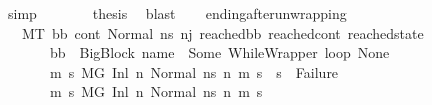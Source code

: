 \begin{isabellebody}
\ simp\isanewline
\ \ \ \ \isamarkupfalse%
\ \isamarkupfalse%
\ {\isacharquery}{\kern0pt}thesis\ \isamarkupfalse%
\ blast\isanewline
\ \ \isamarkupfalse%
\isanewline
{}\isamarkupfalse%
%
\endisatagproof
{\isafoldproof}%
%
\isadelimproof
\isanewline
%
\endisadelimproof
\isanewline
{}\isamarkupfalse%
\ ending{\isacharunderscore}{\kern0pt}after{\isacharunderscore}{\kern0pt}unwrapping{\isacharcolon}{\kern0pt}\isanewline
\ \ \ {\isachardoublequoteopen}M{\isacharcomma}{\kern0pt}{\isasymLambda}{\isacharcomma}{\kern0pt}{\isasymGamma}{\isacharcomma}{\kern0pt}{\isasymOmega}{\isacharcomma}{\kern0pt}T\ {\isasymturnstile}{\isacharparenleft}{\kern0pt}bb{\isacharcomma}{\kern0pt}\ cont{}{\isacharcomma}{\kern0pt}\ Normal\ ns{}{\isacharprime}{\kern0pt}{\isacharprime}{\kern0pt}{\isacharparenright}{\kern0pt}\ {\isacharminus}{\kern0pt}n{\isasymlongrightarrow}{\isacharcircum}{\kern0pt}j\ {\isacharparenleft}{\kern0pt}reached{\isacharunderscore}{\kern0pt}bb{\isacharcomma}{\kern0pt}\ reached{\isacharunderscore}{\kern0pt}cont{\isacharcomma}{\kern0pt}\ reached{\isacharunderscore}{\kern0pt}state{\isacharparenright}{\kern0pt}{\isachardoublequoteclose}\ \isanewline
\ \ \ \ \ \ \ {\isachardoublequoteopen}bb\ {\isacharequal}{\kern0pt}\ BigBlock\ name\ {\isacharbrackleft}{\kern0pt}{\isacharbrackright}{\kern0pt}\ {\isacharparenleft}{\kern0pt}Some\ {\isacharparenleft}{\kern0pt}WhileWrapper\ loop{\isacharparenright}{\kern0pt}{\isacharparenright}{\kern0pt}\ None{\isachardoublequoteclose}\isanewline
\ \ \ \ \ \ \ {\isachardoublequoteopen}{\isasymAnd}m{}\ s{}{\isachardot}{\kern0pt}\ {\isacharparenleft}{\kern0pt}M{\isacharcomma}{\kern0pt}{\isasymLambda}{\isacharcomma}{\kern0pt}{\isasymGamma}{\isacharcomma}{\kern0pt}{\isasymOmega}{\isacharcomma}{\kern0pt}G\ {\isasymturnstile}{\isacharparenleft}{\kern0pt}Inl\ n{\isacharcomma}{\kern0pt}\ Normal\ ns{}{\isacharprime}{\kern0pt}{\isacharprime}{\kern0pt}{\isacharparenright}{\kern0pt}\ {\isacharminus}{\kern0pt}n{\isasymrightarrow}{\isacharasterisk}{\kern0pt}\ {\isacharparenleft}{\kern0pt}m{}{\isacharcomma}{\kern0pt}\ s{}{\isacharparenright}{\kern0pt}{\isacharparenright}{\kern0pt}\ {\isasymLongrightarrow}\ s{}\ {\isasymnoteq}\ Failure{\isachardoublequoteclose}\isanewline
\ \ \ \ \ \ \ {\isachardoublequoteopen}{\isasymAnd}m{\isacharprime}{\kern0pt}\ s{\isacharprime}{\kern0pt}{\isachardot}{\kern0pt}\ {\isacharparenleft}{\kern0pt}M{\isacharcomma}{\kern0pt}{\isasymLambda}{\isacharcomma}{\kern0pt}{\isasymGamma}{\isacharcomma}{\kern0pt}{\isasymOmega}{\isacharcomma}{\kern0pt}G\ {\isasymturnstile}{\isacharparenleft}{\kern0pt}Inl\ n{\isacharcomma}{\kern0pt}\ Normal\ ns{}{\isacharprime}{\kern0pt}{\isacharprime}{\kern0pt}{\isacharparenright}{\kern0pt}\ {\isacharminus}{\kern0pt}n{\isasymrightarrow}{\isacharasterisk}{\kern0pt}\ {\isacharparenleft}{\kern0pt}m{\isacharprime}{\kern0pt}{\isacharcomma}{\kern0pt}\ s{\isacharprime}{\kern0pt}{\isacharparenright}{\kern0pt}{\isacharparenright}{\kern0pt}\ {\isasymLongrightarrow}\isanewline

\end{isabellebody}
